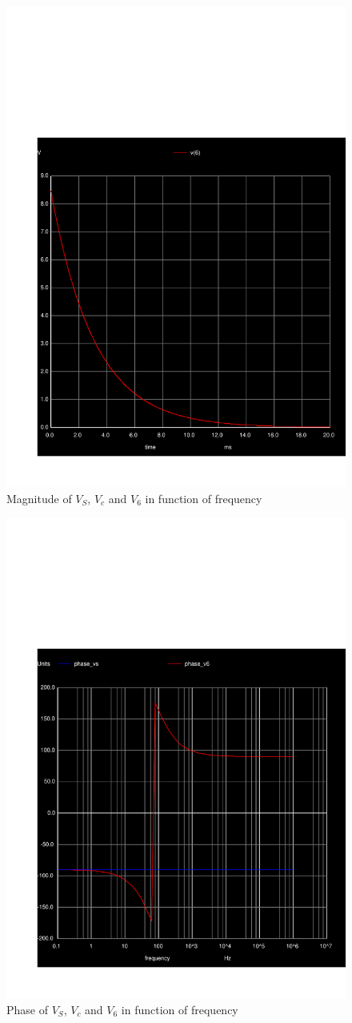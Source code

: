 \begin{figure}[!h]
	\centering
	\includegraphics[width=0.7\linewidth]{../sim/natural.pdf}
	\caption{Magnitude of $V_S$, $V_c$ and $V_6$ in function of frequency}
\end{figure}

\begin{figure}[!h]
	\centering
	\includegraphics[width=0.7\linewidth]{../sim/phase.pdf}
	\caption{Phase of $V_S$, $V_c$ and $V_6$ in function of frequency}
\end{figure}